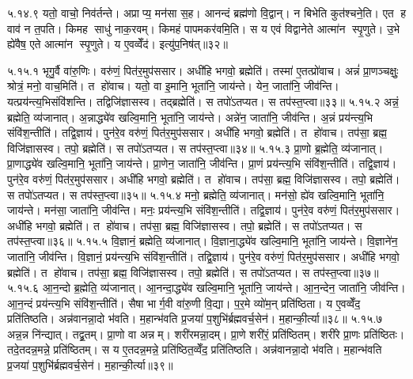५.१४.९
यतो॒ वाचो॒ निव॑र्तन्ते। अप्राप्य॒ मन॑सा स॒ह। आनन्दं ब्रह्म॑णो वि॒द्वान्। न बिभेति कुत॑श्चने॒ति। एत ह वाव॑ न त॒पति। किमह साधु॑ नाक॒रवम्। किमहं पापमकर॑वमि॒ति। स य एवं  विद्वानेते आत्मा॑न स्पृ॒णुते। उ॒भे ह्ये॑वैष॒ एते आत्मा॑न स्पृ॒णुते। य ए॒वव्वेँद॑। इत्यु॑प॒निष॑त्॥३२॥


\setcounter{anuvakam}{0}

५.१५.१
भृगु॒र्वै वा॑रु॒णिः। वरु॑णं॒ पित॑र॒मुप॑ससार। अधी॑हि भगवो॒ ब्रह्मेति॑। तस्मा॑ ए॒तत्प्रो॑वाच। अन्नं॑ प्रा॒णञ्चक्षुः॒ श्रोत्रं॒ मनो॒ वाच॒मिति॑। त हो॑वाच। यतो॒ वा इ॒मानि॒ भूता॑नि॒ जाय॑न्ते। येन॒ जाता॑नि॒ जीव॑न्ति। यत्प्रय॑न्त्य॒भिसंवि॑शन्ति। तद्विजि॑ज्ञासस्व। तद्ब्रह्मेति॑। स तपो॑ऽतप्यत। स तप॑स्त॒प्त्वा॥३३॥
५.१५.२
अन्नं॒ ब्रह्मेति॒ व्य॑जानात्। अ॒न्नाद्ध्ये॑व खल्वि॒मानि॒ भूता॑नि॒ जाय॑न्ते। अन्ने॑न॒ जाता॑नि॒ जीव॑न्ति। अ॒न्नं प्रय॑न्त्य॒भि  संवि॑श॒न्तीति॑। तद्वि॒ज्ञाय॑। पुन॑रे॒व वरु॑णं॒ पित॑र॒मुप॑ससार। अधी॑हि भगवो॒ ब्रह्मेति॑। त हो॑वाच। तप॑सा॒ ब्रह्म॒ विजि॑ज्ञासस्व। तपो॒ ब्रह्मेति॑। स तपो॑ऽतप्यत। स तप॑स्त॒प्त्वा॥३४॥
५.१५.३
प्रा॒णो ब्र॒ह्मेति॒ व्य॑जानात्। प्रा॒णाद्ध्ये॑व खल्वि॒मानि॒ भूता॑नि॒ जाय॑न्ते। प्रा॒णेन॒ जाता॑नि॒ जीव॑न्ति। प्रा॒णं प्रय॑न्त्य॒भि  संवि॑श॒न्तीति॑। तद्वि॒ज्ञाय॑। पुन॑रे॒व वरु॑णं॒ पित॑र॒मुप॑ससार। अधी॑हि भगवो॒ ब्रह्मेति॑। त हो॑वाच। तप॑सा॒ ब्रह्म॒ विजि॑ज्ञासस्व। तपो॒ ब्रह्मेति॑। स तपो॑ऽतप्यत। स तप॑स्त॒प्त्वा॥३५॥
५.१५.४
मनो॒ ब्रह्मेति॒ व्य॑जानात्। मन॑सो॒ ह्ये॑व खल्वि॒मानि॒ भूता॑नि॒ जाय॑न्ते। मन॑सा॒ जाता॑नि॒ जीव॑न्ति। मनः॒ प्रय॑न्त्य॒भि  संवि॑श॒न्तीति॑। तद्वि॒ज्ञाय॑। पुन॑रे॒व वरु॑णं॒ पित॑र॒मुप॑ससार। अधी॑हि भगवो॒ ब्रह्मेति॑। त हो॑वाच। तप॑सा॒ ब्रह्म॒ विजि॑ज्ञासस्व। तपो॒ ब्रह्मेति॑। स तपो॑ऽतप्यत। स तप॑स्त॒प्त्वा॥३६॥
५.१५.५
वि॒ज्ञानं॒ ब्रह्मेति॒ व्य॑जानात्। वि॒ज्ञाना॒द्ध्ये॑व खल्वि॒मानि॒ भूता॑नि॒ जाय॑न्ते। वि॒ज्ञाने॑न॒ जाता॑नि॒ जीव॑न्ति। वि॒ज्ञानं॒ प्रय॑न्त्य॒भि संवि॑श॒न्तीति॑। तद्वि॒ज्ञाय॑। पुन॑रे॒व वरु॑णं॒ पित॑र॒मुप॑ससार। अधी॑हि भगवो॒ ब्रह्मेति॑। त हो॑वाच। तप॑सा॒ ब्रह्म॒ विजि॑ज्ञासस्व। तपो॒ ब्रह्मेति॑। स तपो॑ऽतप्यत। स तप॑स्त॒प्त्वा॥३७॥
५.१५.६
आ॒न॒न्दो ब्र॒ह्मेति॒ व्य॑जानात्। आ॒नन्दा॒द्ध्ये॑व खल्वि॒मानि॒ भूता॑नि॒ जाय॑न्ते। आ॒न॒न्देन॒ जाता॑नि॒ जीव॑न्ति। आ॒न॒न्दं प्रय॑न्त्य॒भि संवि॑श॒न्तीति॑। सैषा भार्ग॒वी वा॑रु॒णी वि॒द्या। प॒र॒मे व्यो॑म॒न् प्रति॑ष्ठिता। य ए॒वव्वेँद॒ प्रति॑तिष्ठति। अन्न॑वानन्ना॒दो भ॑वति। म॒हान्भ॑वति प्र॒जया॑ प॒शुभि॑र्ब्रह्मवर्च॒सेन॑। म॒हान्की॒र्त्या॥३८॥
५.१५.७
अन्न॒न्न नि॑न्द्यात्। तद्व्र॒तम्। प्रा॒णो वा अन्नम्। शरी॑रमन्ना॒दम्। प्रा॒णे शरी॑रं॒ प्रति॑ष्ठितम्। शरी॑रे प्रा॒णः प्रति॑ष्ठितः। तदे॒तदन्न॒मन्ने॒ प्रति॑ष्ठितम्। स य ए॒तदन्न॒मन्ने॒ प्रति॑ष्ठित॒व्वेँद॒ प्रति॑तिष्ठति। अन्न॑वानन्ना॒दो भ॑वति। म॒हान्भ॑वति प्र॒जया॑ प॒शुभि॑र्ब्रह्मवर्च॒सेन॑। म॒हान्की॒र्त्या॥३९॥
